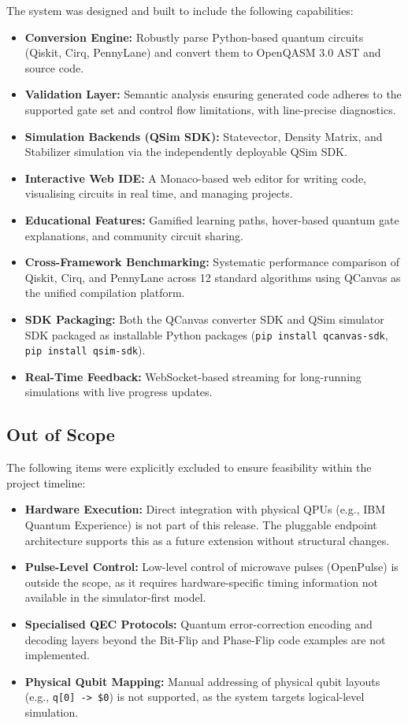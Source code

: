 The system was designed and built to include the following capabilities:
\begin{itemize}
    \item \textbf{Conversion Engine:} Robustly parse Python-based quantum circuits (Qiskit, Cirq, PennyLane) and convert them to OpenQASM 3.0 AST and source code.
    \item \textbf{Validation Layer:} Semantic analysis ensuring generated code adheres to the supported gate set and control flow limitations, with line-precise diagnostics.
    \item \textbf{Simulation Backends (QSim SDK):} Statevector, Density Matrix, and Stabilizer simulation via the independently deployable QSim SDK.
    \item \textbf{Interactive Web IDE:} A Monaco-based web editor for writing code, visualising circuits in real time, and managing projects.
    \item \textbf{Educational Features:} Gamified learning paths, hover-based quantum gate explanations, and community circuit sharing.
    \item \textbf{Cross-Framework Benchmarking:} Systematic performance comparison of Qiskit, Cirq, and PennyLane across 12 standard algorithms using QCanvas as the unified compilation platform.
    \item \textbf{SDK Packaging:} Both the QCanvas converter SDK and QSim simulator SDK packaged as installable Python packages (\texttt{pip install qcanvas-sdk}, \texttt{pip install qsim-sdk}).
    \item \textbf{Real-Time Feedback:} WebSocket-based streaming for long-running simulations with live progress updates.
\end{itemize}

\subsection{Out of Scope}

The following items were explicitly excluded to ensure feasibility within the project timeline:
\begin{itemize}
    \item \textbf{Hardware Execution:} Direct integration with physical QPUs (e.g., IBM Quantum Experience) is not part of this release. The pluggable endpoint architecture supports this as a future extension without structural changes.
    \item \textbf{Pulse-Level Control:} Low-level control of microwave pulses (OpenPulse) is outside the scope, as it requires hardware-specific timing information not available in the simulator-first model.
    \item \textbf{Specialised QEC Protocols:} Quantum error-correction encoding and decoding layers beyond the Bit-Flip and Phase-Flip code examples are not implemented.
    \item \textbf{Physical Qubit Mapping:} Manual addressing of physical qubit layouts (e.g., \texttt{q[0] -> \$0}) is not supported, as the system targets logical-level simulation.
\end{itemize}

